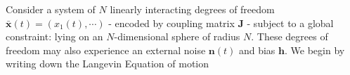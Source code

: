 Consider a system of $N$ linearly interacting degrees of freedom $\mathbf{\bar x}(t) = (x_1(t),\cdots)$ - encoded by coupling matrix $\mathbf{J}$ - subject to a global constraint: lying on an $N$-dimensional sphere of radius $N$. These degrees of freedom may also experience an external noise $\mathbf{n}(t)$ and bias $\mathbf{h}$. We begin by writing down the Langevin Equation of motion